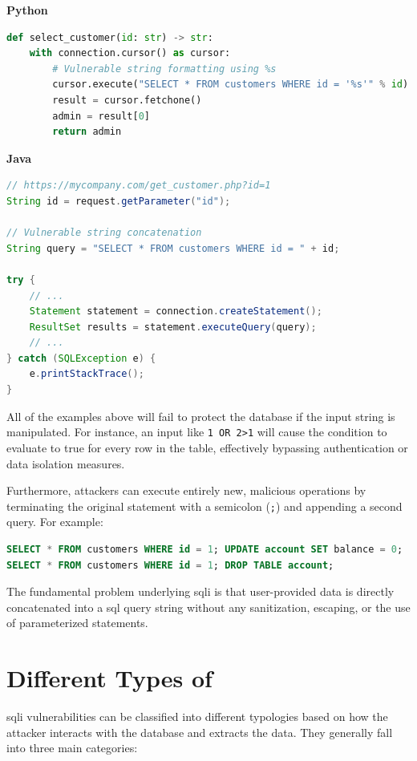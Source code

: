 \textbf{Python}
\begin{lstlisting}[language=Python]
def select_customer(id: str) -> str:
    with connection.cursor() as cursor:
        # Vulnerable string formatting using %s
        cursor.execute("SELECT * FROM customers WHERE id = '%s'" % id)
        result = cursor.fetchone()
        admin = result[0]
        return admin
\end{lstlisting}

\textbf{Java}
\begin{lstlisting}[language=Java]
// https://mycompany.com/get_customer.php?id=1
String id = request.getParameter("id");

// Vulnerable string concatenation
String query = "SELECT * FROM customers WHERE id = " + id;

try {
    // ...
    Statement statement = connection.createStatement();
    ResultSet results = statement.executeQuery(query);
    // ...
} catch (SQLException e) {
    e.printStackTrace();
}
\end{lstlisting}

All of the examples above will fail to protect the database if the input string is manipulated. For instance, an input like \texttt{1 OR 2>1} will cause the condition to evaluate to true for every row in the table, effectively bypassing authentication or data isolation measures. 

Furthermore, attackers can execute entirely new, malicious operations by terminating the original statement with a semicolon (\texttt{;}) and appending a second query. For example:

\begin{lstlisting}[language=SQL]
SELECT * FROM customers WHERE id = 1; UPDATE account SET balance = 0;
SELECT * FROM customers WHERE id = 1; DROP TABLE account;
\end{lstlisting}

\noindent The fundamental problem underlying \gls{sqli} is that user-provided data is directly concatenated into a \gls{sql} query string without any sanitization, escaping, or the use of parameterized statements.

\section{Different Types of } 
\gls{sqli} vulnerabilities can be classified into different typologies based on how the attacker interacts with the database and extracts the data. They generally fall into three main categories:

